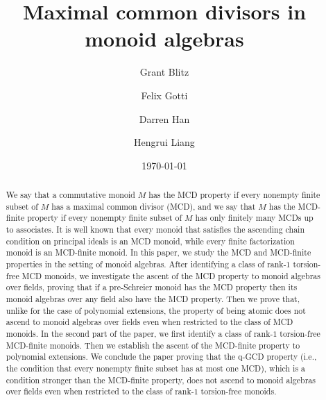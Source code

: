 \documentclass[10pt]{amsart}
\theoremstyle{definition}
\theoremstyle{remark}
\numberwithin{equation}{section}
\begin{document}
\mbox{}
\title{Maximal common divisors in monoid algebras}

\author{Grant Blitz}
\address{PRIMES-USA\\MIT\\Cambridge, MA 02139}

\author{Felix Gotti}
\address{Department of Mathematics\\MIT\\Cambridge, MA 02139}

\author{Darren Han}
\address{Department of Mathematics\\MIT\\Cambridge, MA 02139}

\author{Hengrui Liang}
\address{PRIMES-USA\\MIT\\Cambridge, MA 02139}

\date{\today}

\begin{abstract}
  We say that a commutative monoid $M$ has the MCD property if every nonempty finite subset of $M$ has a maximal common divisor (MCD), and we say that $M$ has the MCD-finite property if every nonempty finite subset of $M$ has only finitely many MCDs up to associates. It is well known that every monoid that satisfies the ascending chain condition on principal ideals is an MCD monoid, while every finite factorization monoid is an MCD-finite monoid. In this paper, we study the MCD and MCD-finite properties in the setting of monoid algebras. After identifying a class of rank-$1$ torsion-free MCD monoids, we investigate the ascent of the MCD property to monoid algebras over fields, proving that if a pre-Schreier monoid has the MCD property then its monoid algebras over any field also have the MCD property. Then we prove that, unlike for the case of polynomial extensions, the property of being atomic does not ascend to monoid algebras over fields even when restricted to the class of MCD monoids. In the second part of the paper, we first identify a class of rank-$1$ torsion-free MCD-finite monoids. Then we establish the ascent of the MCD-finite property to polynomial extensions. We conclude the paper proving that the q-GCD property (i.e., the condition that every nonempty finite subset has at most one MCD), which is a condition stronger than the MCD-finite property, does not ascend to monoid algebras over fields even when restricted to the class of rank-$1$ torsion-free monoids.
\end{abstract}
\end{document}

